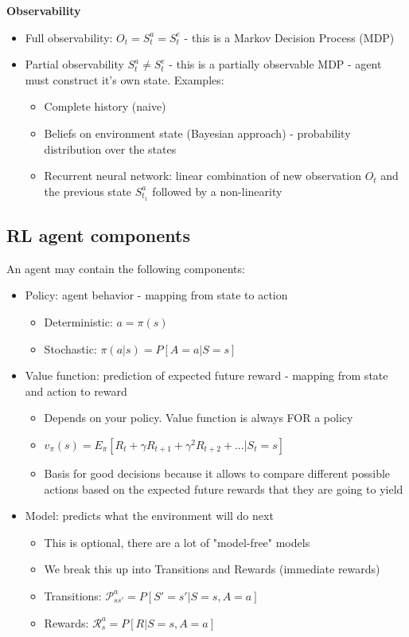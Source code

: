 \documentclass{article}
\begin{document}
\textbf{Observability}
\begin{itemize}
    \item Full observability: $O_t=S_t^a=S_t^e$ - this is a Markov Decision Process (MDP)
    \item Partial observability $S_t^a \neq S_t^e$ - this is a partially observable MDP - agent must construct it's own state. Examples:
    \begin{itemize}
        \item Complete history (naive)
        \item Beliefs on environment state (Bayesian approach) - probability distribution over the states
        \item Recurrent neural network: linear combination of new observation $O_t$ and the previous state $S_{t_1}^a$ followed by a non-linearity
    \end{itemize}
\end{itemize}

\subsection{RL agent components}

An agent may contain the following components:
\begin{itemize}
    \item Policy: agent behavior - mapping from state to action 
    \begin{itemize}
        \item Deterministic: $a=\pi(s)$
        \item Stochastic: $\pi(a|s)=P[A=a|S=s]$
    \end{itemize}
    \item Value function: prediction of expected future reward - mapping from state and action to reward
    \begin{itemize}
        \item Depends on your policy. Value function is always FOR a policy
        \item $v_\pi(s)=E_\pi[R_t+\gamma R_{t+1} + \gamma^2R_{t+2} + ... | S_t=s]$
        \item Basis for good decisions because it allows to compare different possible actions based on the expected future rewards that they are going to yield
    \end{itemize}
    \item Model: predicts what the environment will do next
    \begin{itemize}
        \item This is optional, there are a lot of "model-free" models
        \item We break this up into Transitions and Rewards (immediate rewards)
        \item Transitions: $\mathcal{P}^a_{ss'}=P[S'=s'|S=s, A=a]$
        \item Rewards: $\mathcal{R}^a_{s}=P[R|S=s, A=a]$
    \end{itemize}
\end{itemize}
\end{document}
